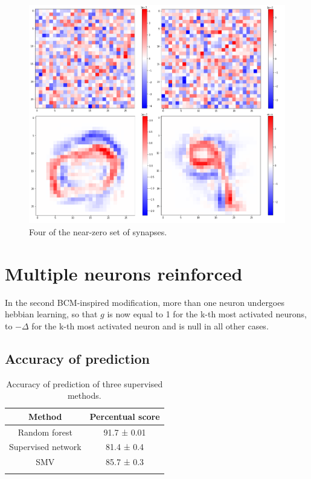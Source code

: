 \documentclass[a4paper]{report}
\begin{document}
\begin{figure} [H]
\centering
\includegraphics [width=12cm ] {h/centodue.png}
\caption{Four of the near-zero set of synapses.}
\label{nearzero}
\end{figure}

\section{Multiple neurons reinforced}

In the second BCM-inspired modification, more than one neuron undergoes hebbian learning, so that $g$ is now equal to 1 for the k-th most activated neurons, to $-\Delta$ for the k-th most activated neuron and is null in all other cases.

\subsection{Accuracy of prediction}

\begin{table}[hb!]
  \begin{center}
    \caption{Accuracy of prediction of three supervised methods.}
    \begin{tabular}{c|c} %
      \textbf{Method} & \textbf{Percentual score}\\
      \hline
      Random forest & 91.7  ± 0.01\\
      Supervised network & 81.4 ± 0.4\\
      SMV & 85.7 ± 0.3\\
      \label{4tab}
    \end{tabular}
  \end{center}
\end{table}
\end{document}
